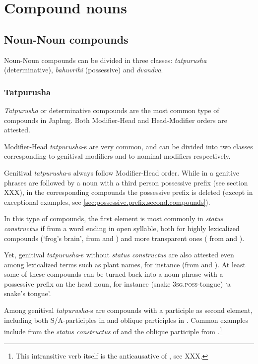\section{Compound nouns}
\subsection{Noun-Noun compounds} \label{sec.n.n.compounds}
Noun-Noun compounds can be divided in three classes: \textit{tatpurusha} (determinative), \textit{bahuvrīhi} (possessive)  and \textit{dvandva}.

\subsubsection{Tatpurusha} \label{sec:tatpurusha.n.n}
\textit{Tatpurusha} or determinative compounds are the most common type of compounds in Japhug. Both Modifier-Head and Head-Modifier orders are attested. 

Modifier-Head \textit{tatpurusha}-s are very common, and can be divided into two classes corresponding to genitival modifiers and to nominal modifiers respectively.

Genitival  \textit{tatpurusha}-s always follow Modifier-Head order. While in a genitive phrases are followed by a noun with a third person possessive prefix (see section XXX), in the corresponding compounds the possessive prefix is deleted (except in exceptional examples, see \ref{sec:possessive.prefix.second.compounds}).

In this type of compounds, the first element is most commonly in \textit{status constructus} if from a word ending in open syllable, both for highly lexicalized compounds  (`frog's brain', from  and ) and more transparent ones ( from   and ). 

Yet, genitival \textit{tatpurusha}-s without \textit{status constructus} are also attested even among lexicalized terms such as plant names, for instance  (from  and ). At least some of these compounds can be turned back into a noun phrase with a possessive prefix on the head noun, for instance  (snake \textsc{3sg.poss}-tongue) `a snake's tongue'.

Among genitival \textit{tatpurusha}-s are compounds with a participle as second element, including both S/A-participles in  and oblique participles in . Common examples include   from the \textit{status constructus} of  and the oblique participle  from .\footnote{This intransitive verb itself is the anticausative of , see XXX. }

